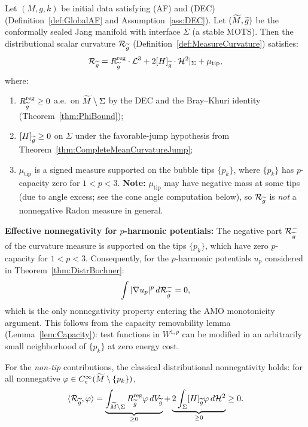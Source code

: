 \begin{theorem}\label{thm:CurvatureMeasureSign}
Let $(M, g, k)$ be initial data satisfying (AF) and (DEC) (Definition~\ref{def:GlobalAF} and Assumption~\ref{ass:DEC}). Let $(\widetilde{M}, \widetilde{g})$ be the conformally sealed Jang manifold with interface $\Sigma$ (a stable MOTS). Then the distributional scalar curvature $\mathcal{R}_{\widetilde{g}}$ (Definition~\ref{def:MeasureCurvature}) satisfies:
\begin{equation}\label{eq:CurvatureMeasureDecomp}
    \mathcal{R}_{\widetilde{g}} = R_{\widetilde{g}}^{\mathrm{reg}} \cdot \mathcal{L}^3 + 2[H]_{\widetilde{g}} \cdot \mathcal{H}^2|_\Sigma + \mu_{\mathrm{tip}},
\end{equation}
where:
\begin{enumerate}
    \item $R_{\widetilde{g}}^{\mathrm{reg}} \ge 0$ a.e.\ on $\widetilde{M} \setminus \Sigma$ by the DEC and the Bray--Khuri identity (Theorem~\ref{thm:PhiBound});
    \item $[H]_{\widetilde{g}} \ge 0$ on $\Sigma$ under the favorable-jump hypothesis from Theorem~\ref{thm:CompleteMeanCurvatureJump};
    \item $\mu_{\mathrm{tip}}$ is a signed measure supported on the bubble tips $\{p_k\}$, where $\{p_k\}$ has $p$-capacity zero for $1 < p < 3$. \textbf{Note:} $\mu_{\mathrm{tip}}$ may have negative mass at some tips (due to angle excess; see the cone angle computation below), so $\mathcal{R}_{\widetilde{g}}$ is \emph{not} a nonnegative Radon measure in general.
\end{enumerate}
\textbf{Effective nonnegativity for $p$-harmonic potentials:} The negative part $\mathcal{R}_{\widetilde{g}}^-$ of the curvature measure is supported on the tips $\{p_k\}$, which have zero $p$-capacity for $1 < p < 3$. Consequently, for the $p$-harmonic potentials $u_p$ considered in Theorem~\ref{thm:DistrBochner}:
\begin{equation}\label{eq:CurvatureEffectivePositive}
    \int |\nabla u_p|^p \, d\mathcal{R}_{\widetilde{g}}^- = 0,
\end{equation}
which is the only nonnegativity property entering the AMO monotonicity argument. This follows from the capacity removability lemma (Lemma~\ref{lem:Capacity}): test functions in $W^{1,p}$ can be modified in an arbitrarily small neighborhood of $\{p_k\}$ at zero energy cost.

For the \emph{non-tip} contributions, the classical distributional nonnegativity holds: for all nonnegative $\varphi \in C^\infty_c(\widetilde{M} \setminus \{p_k\})$,
\begin{equation}\label{eq:CurvatureDistribPositive}
    \langle \mathcal{R}_{\widetilde{g}}, \varphi \rangle = \underbrace{\int_{\widetilde{M} \setminus \Sigma} R_{\widetilde{g}}^{\mathrm{reg}} \varphi \, dV_{\widetilde{g}}}_{\ge 0} + \underbrace{2\int_\Sigma [H]_{\widetilde{g}} \varphi \, d\mathcal{H}^2}_{\ge 0} \ge 0.
\end{equation}
\end{theorem}

